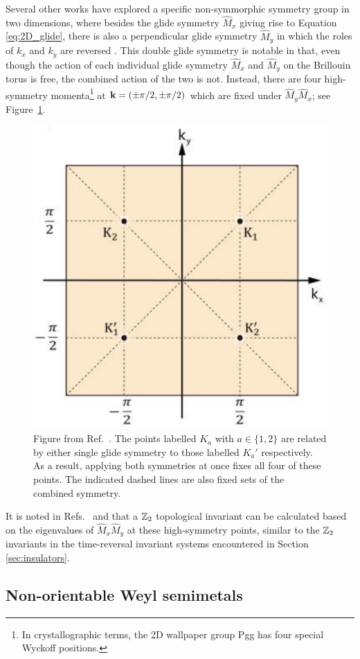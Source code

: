 Several other works have explored a specific non-symmorphic symmetry group in two dimensions, where besides the glide symmetry $\hat{M}_x$ giving rise to Equation \eqref{eq:2D_glide}, there is also a perpendicular glide symmetry $\hat{M}_y$ in which the roles of $k_x$ and $k_y$ are reversed \cite{HZY_RP2,WangZhang_acoustic-Klein-2D,Tao_quadrupole}. This double glide symmetry is notable in that, even though the action of each individual glide symmetry $\hat{M}_x$ and $\hat{M}_y$ on the Brillouin torus is free, the combined action of the two is not. Instead, there are four high-symmetry momenta\footnote{
	In crystallographic terms, the 2D wallpaper group Pgg has four special Wyckoff positions.}
at $\vb{k} = (\pm\pi/2,\pm\pi/2)$ which are fixed under $\hat{M}_y\hat{M}_x$; see Figure~\ref{fig:Pgg-fixed-points}.
\begin{figure}[htb!]
	\centering
	\includegraphics[width=.5\linewidth]{Images/Pgg-fixed-points}
	\caption{Figure from Ref.~\cite{WangZhang_acoustic-Klein-2D}. The points labelled $K_a$ with $a\in\{1,2\}$ are related by either single glide symmetry to those labelled $K_a'$ respectively. As a result, applying both symmetries at once fixes all four of these points. The indicated dashed lines are also fixed sets of the combined symmetry.} %
	\label{fig:Pgg-fixed-points}
\end{figure}
It is noted in Refs.~\cite{HZY_RP2} and \cite{WangZhang_acoustic-Klein-2D} that a $\mathbb{Z}_2$ topological invariant can be calculated based on the eigenvalues of $\hat{M}_x\hat{M}_y$ at these high-symmetry points, similar to the $\mathbb{Z}_2$ invariants in the time-reversal invariant systems encountered in Section \ref{sec:insulators}.

\subsection{Non-orientable Weyl semimetals}

